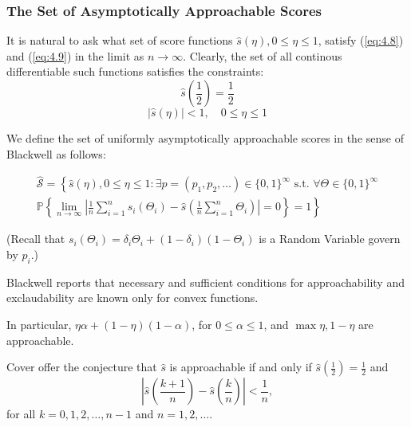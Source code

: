 \documentclass[11pt]{article}
\numberwithin{equation}{section}
\theoremstyle{boldStyle}
\begin{document}
\subsubsection{The Set of Asymptotically Approachable Scores}

It is natural to ask what set of score functions $\hat{s}(\eta), 0 \leq \eta \leq 1$, satisfy (\ref{eq:4.8}) and (\ref{eq:4.9}) in the 
limit as $n \to \infty$. Clearly, the set of all continous differentiable such functions satisfies the constraints: 
\begin{equation}
    \hat{s}(\frac{1}{2}) = \frac{1}{2}
\end{equation}
\begin{equation}
    \left| \hat{s}(\eta) \right| < 1 , \quad 0 \leq \eta \leq 1
\end{equation}

We define the set of uniformly asymptotically approachable scores in the sense of Blackwell as follows:



\begin{equation}
    \begin{aligned}
        \hat{\mathcal{S}} = \left\{ \hat{s}(\eta), 0 \leq \eta \leq 1 : \exists p = (p_1, p_2, \ldots) \in \{0,1\}^\infty \text{ s.t. } \forall \Theta \in \{0,1\}^\infty \right. \\
        \left. \mathbb{P} \left\{ \lim_{n \to \infty} \left| \frac{1}{n} \sum_{i=1}^n s_i(\Theta_i) - \hat{s} \left( \frac{1}{n} \sum_{i=1}^n \Theta_i \right) \right| = 0 \right\} = 1 \right\}
    \end{aligned}
\end{equation}

(Recall that $s_i(\Theta_i) = \delta_i \Theta_i + (1 - \delta_i)(1 - \Theta_i)$ is a Random Variable govern by $p_i$.)

Blackwell reports that necessary and sufficient conditions for approachability and exclaudability are known only for convex functions. 

In particular, $\eta \alpha + (1 - \eta) (1 - \alpha)$, for $0 \leq \alpha \leq 1$, and $\max{\eta, 1 - \eta}$ are approachable.

\bigbreak

Cover offer the conjecture that $\hat{s}$ is approachable if and only if $\hat{s}\left(\frac{1}{2}\right) = \frac{1}{2}$ and
\[
\left| \hat{s}\left(\frac{k+1}{n}\right) - \hat{s}\left(\frac{k}{n}\right) \right| < \frac{1}{n},
\]
for all \( k = 0, 1, 2, \dots, n-1 \) and \( n = 1, 2, \dots \).
\end{document}
